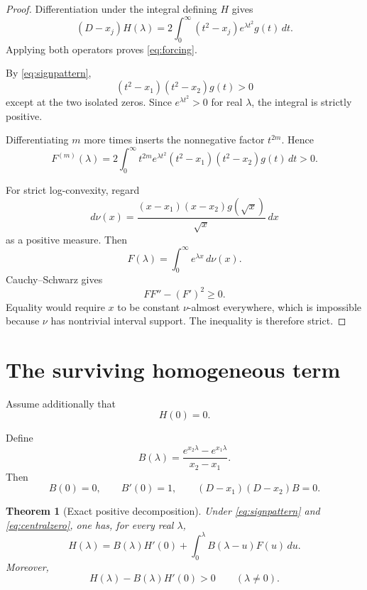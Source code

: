 \documentclass[11pt]{article}
\newtheorem{theorem}{Theorem}
\begin{document}
\begin{proof}
Differentiation under the integral defining
$H$ gives
\[
(D-x_j)H(\lambda)
=
2\int_0^\infty
(t^2-x_j)e^{\lambda t^2}g(t)\,dt.
\]
Applying both operators proves
\eqref{eq:forcing}.

By \eqref{eq:signpattern},
\[
(t^2-x_1)(t^2-x_2)g(t)>0
\]
except at the two isolated zeros.
Since $e^{\lambda t^2}>0$ for real $\lambda$,
the integral is strictly positive.

Differentiating $m$ more times inserts the
nonnegative factor $t^{2m}$. Hence
\[
F^{(m)}(\lambda)=
2\int_0^\infty
t^{2m}e^{\lambda t^2}
(t^2-x_1)(t^2-x_2)g(t)\,dt>0.
\]

For strict log-convexity, regard
\[
d\nu(x)=
\frac{(x-x_1)(x-x_2)g(\sqrt{x})}{\sqrt{x}}\,dx
\]
as a positive measure. Then
\[
F(\lambda)=\int_0^\infty e^{\lambda x}\,d\nu(x).
\]
Cauchy--Schwarz gives
\[
FF''-(F')^2\ge0.
\]
Equality would require $x$ to be constant
$\nu$-almost everywhere, which is impossible
because $\nu$ has nontrivial interval support.
The inequality is therefore strict.
\end{proof}

\section{The surviving homogeneous term}

Assume additionally that
\begin{equation}
H(0)=0.
\label{eq:centralzero}
\end{equation}

Define
\begin{equation}
B(\lambda)=
\frac{e^{x_2\lambda}-e^{x_1\lambda}}
{x_2-x_1}.
\label{eq:B}
\end{equation}
Then
\[
B(0)=0,\qquad B'(0)=1,
\qquad
(D-x_1)(D-x_2)B=0.
\]

\begin{theorem}[Exact positive decomposition]
\label{thm:decomposition}
Under \eqref{eq:signpattern} and
\eqref{eq:centralzero}, one has, for every
real $\lambda$,
\begin{equation}
\boxed{
H(\lambda)=
B(\lambda)H'(0)+
\int_0^\lambda B(\lambda-u)F(u)\,du.
}
\label{eq:duhamel}
\end{equation}
Moreover,
\begin{equation}
\boxed{
H(\lambda)-B(\lambda)H'(0)>0
\qquad(\lambda\ne0).
}
\label{eq:strictremainder}
\end{equation}
\end{theorem}
\end{document}
